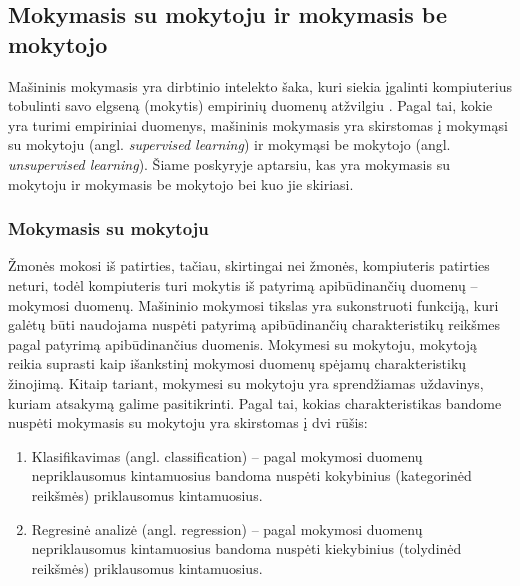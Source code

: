 \subsection{Mokymasis su mokytoju ir mokymasis be mokytojo}

Mašininis mokymasis yra dirbtinio intelekto šaka, kuri siekia įgalinti kompiuterius tobulinti savo elgseną (mokytis) empirinių duomenų atžvilgiu \cite{duda2001pattern}. Pagal tai, kokie yra turimi empiriniai duomenys, mašininis mokymasis yra skirstomas į mokymąsi su mokytoju (angl. \textit{supervised learning}) ir mokymąsi be mokytojo (angl. \textit{unsupervised learning}). Šiame poskyryje aptarsiu, kas yra mokymasis su mokytoju ir mokymasis be mokytojo bei kuo jie skiriasi.

\subsubsection{Mokymasis su mokytoju}

Žmonės mokosi iš patirties, tačiau, skirtingai nei žmonės, kompiuteris patirties neturi, todėl kompiuteris turi mokytis iš patyrimą apibūdinančių duomenų -- mokymosi duomenų. Mašininio mokymosi tikslas yra sukonstruoti funkciją, kuri galėtų būti naudojama nuspėti patyrimą apibūdinančių charakteristikų reikšmes pagal patyrimą apibūdinančius duomenis. Mokymesi su mokytoju, mokytoją reikia suprasti kaip išankstinį mokymosi duomenų spėjamų charakteristikų žinojimą. Kitaip tariant, mokymesi su mokytoju yra sprendžiamas uždavinys, kuriam atsakymą galime pasitikrinti. Pagal tai, kokias charakteristikas bandome nuspėti mokymasis su mokytoju yra skirstomas į dvi rūšis:
\begin{enumerate}
  \item Klasifikavimas (angl. classification) -- pagal mokymosi duomenų nepriklausomus kintamuosius bandoma nuspėti kokybinius (kategorinėd reikšmės) priklausomus kintamuosius.
  \item Regresinė analizė (angl. regression) -- pagal mokymosi duomenų nepriklausomus kintamuosius bandoma nuspėti kiekybinius (tolydinėd reikšmės) priklausomus kintamuosius.
\end{enumerate} 


